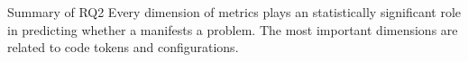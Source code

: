 \vspace{0.5cm}
\begin{Summary}{Summary of RQ2}{}
Every dimension of metrics plays an statistically significant role in predicting whether a \instance manifests a \inconsistent problem. The most important dimensions are related to code tokens and configurations. 
\end{Summary}
